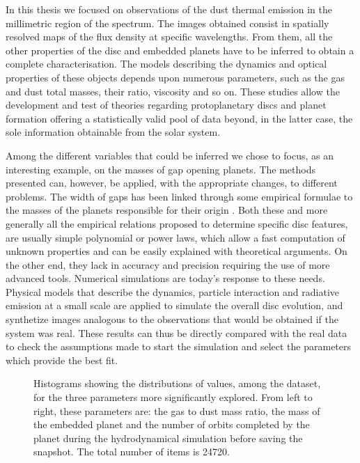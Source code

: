 \documentclass[a4paper,10pt, margin=1cm]{article}
\begin{document}
In this thesis we focused on observations of the dust thermal emission in the
millimetric region of the spectrum. The images obtained consist in spatially resolved maps of
the flux density at specific wavelengths. From them,
all the other properties of the disc and embedded planets have to be inferred to 
obtain a complete characterisation. The models describing the dynamics and optical properties 
of these objects depends upon numerous parameters, such as the gas and dust total masses, their ratio, viscosity and so on.
These studies allow the development and test of theories
regarding protoplanetary discs and
planet formation offering a statistically valid pool of data beyond, in the latter case, the sole information obtainable from the solar system.

Among the different variables that could be inferred we chose to focus, as an interesting 
example, on the masses of gap opening planets. The methods presented can, however, be applied,
with the appropriate changes, to different problems. 
The width of gaps has been linked through some empirical formulae to the masses of the planets responsible for
their origin \citep{Lodato_2019,kanagawa}. Both these and more generally all the empirical relations 
proposed to determine specific disc features, are usually simple polynomial or power laws, which 
allow a fast computation of unknown properties and can be easily explained with theoretical
arguments. On the other end, they lack in accuracy and precision requiring the use of more advanced tools.
Numerical simulations are today's response to these needs. Physical models that describe the dynamics, 
particle interaction and radiative emission at a small scale are applied
to simulate the overall disc evolution, and synthetize images analogous to the observations that would be 
obtained if the system was real.
These results can thus be directly compared  with the real data
to check the assumptions made to start the simulation and 
select the parameters which provide the best fit. 

\begin{figure}
  \begin{center}
    \scalebox{0.8}{}
  \end{center}
  \caption{Histograms showing the distributions of values, among the dataset, for
  the three parameters more significantly explored. From left to right, these parameters are: the gas to dust mass ratio, 
  the mass of the embedded planet and the number of orbits completed by the planet during the hydrodynamical simulation
  before saving the snapshot. The total number of items is 24720.}
\end{figure}
\end{document}
